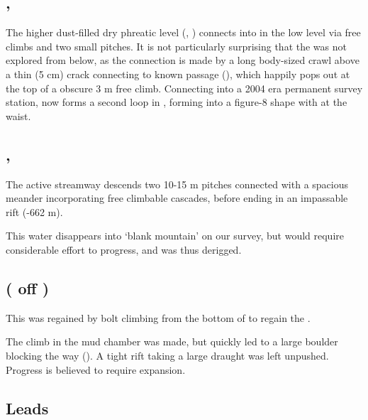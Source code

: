 \subsection{, }

The higher dust-filled dry phreatic level (, ) connects into  in the low level via
free climbs and two small pitches. It is not particularly surprising that the  was not explored from below, as the
connection is made by a long body-sized crawl above a thin (5 cm) crack connecting to known passage (), which happily pops out at the
top of a obscure 3 m free climb. Connecting into a 2004 era permanent survey station,  now forms a second loop in ,
forming  into a figure-8 shape with  at the waist.

\subsection{, }

The active streamway descends two 10-15 m pitches connected with a spacious meander incorporating free climbable cascades, before ending in an impassable rift (-662 m).

This water disappears into `blank mountain' on our survey, but would require considerable effort to progress, and  was thus derigged.


\subsection{ ( off )}

This was regained by bolt climbing from the bottom of  to regain the .

The climb in the mud chamber was made, but quickly led to a large boulder blocking the way (). A tight rift taking a large draught was left unpushed. Progress is believed to require expansion.

\subsection{ Leads}

